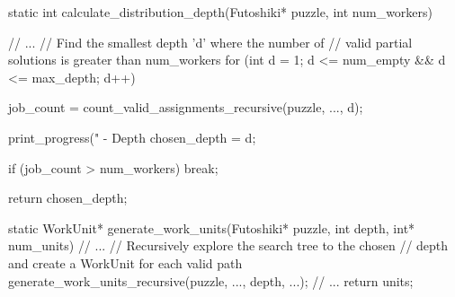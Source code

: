 static int calculate_distribution_depth(Futoshiki* puzzle, int num_workers) {
    // ...
    // Find the smallest depth 'd' where the number of
    // valid partial solutions is greater than num_workers
    for (int d = 1; d <= num_empty && d <= max_depth; d++) {
        job_count = count_valid_assignments_recursive(puzzle, ..., d);

        print_progress("  - Depth %
        chosen_depth = d;

        if (job_count > num_workers) {
            break;
        }
    }
    return chosen_depth;
}

static WorkUnit* generate_work_units(Futoshiki* puzzle, int depth, int* num_units) {
    // ...
    // Recursively explore the search tree to the chosen
    // depth and create a WorkUnit for each valid path
    generate_work_units_recursive(puzzle, ..., depth, ...);
    // ...
    return units;
}